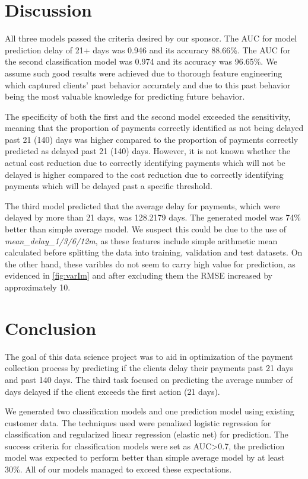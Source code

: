 \documentclass[
]{article}
\begin{document}
\hypertarget{discussion}{%
\section{Discussion}\label{discussion}}

All three models passed the criteria desired by our sponsor. The AUC for model prediction delay of 21+ days was 0.946 and its accuracy 88.66\%. The AUC for the second classification model was 0.974 and its accuracy was 96.65\%. We assume such good results were achieved due to thorough feature engineering which captured clients' past behavior accurately and due to this past behavior being the most valuable knowledge for predicting future behavior.

The specificity of both the first and the second model exceeded the sensitivity, meaning that the proportion of payments correctly identified as not being delayed past 21 (140) days was higher compared to the proportion of payments correctly predicted as delayed past 21 (140) days. However, it is not known whether the actual cost reduction due to correctly identifying payments which will not be delayed is higher compared to the cost reduction due to correctly identifying payments which will be delayed past a specific threshold.

The third model predicted that the average delay for payments, which were delayed by more than 21 days, was 128.2179 days. The generated model was 74\% better than simple average model. We suspect this could be due to the use of \emph{mean\_delay\_1/3/6/12m}, as these features include simple arithmetic mean calculated before splitting the data into training, validation and test datasets. On the other hand, these varibles do not seem to carry high value for prediction, as evidenced in \ref{fig:varIm} and after excluding them the RMSE increased by approximately 10.

\hypertarget{conclusion}{%
\section{Conclusion}\label{conclusion}}

The goal of this data science project was to aid in optimization of the payment collection process by predicting if the clients delay their payments past 21 days and past 140 days. The third task focused on predicting the average number of days delayed if the client exceeds the first action (21 days).

We generated two classification models and one prediction model using existing customer data. The techniques used were penalized logistic regression for classification and regularized linear regression (elastic net) for prediction. The success criteria for classification models were set as AUC\textgreater0.7, the prediction model was expected to perform better than simple average model by at least 30\%. All of our models managed to exceed these expectations.
\end{document}
